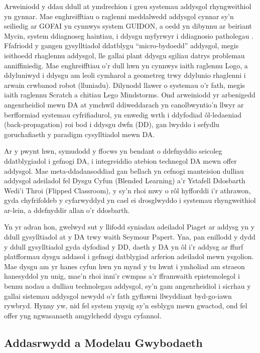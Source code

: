 Arweiniodd y ddau ddull at ymdrechion i greu systemau addysgol rhyngweithiol yn gynnar. Mae enghreifftiau o raglenni meddalwedd addysgol cynnar sy'n seiliedig ar GOFAI yn cynnwys system GUIDON, a oedd yn dibynnu ar beiriant Mycin, system ddiagnoseg haintiau, i ddysgu myfyrwyr i ddiagnosio patholegau \parencite{william_j_guidon_1983}. Ffafriodd y gangen gysylltiadol ddatblygu ``micro-bydoedd'' addysgol, megis ieithoedd rhaglennu addysgol, lle gallai plant ddysgu sgiliau datrys problemau anniffiniedig. Mae enghreifftiau o'r dull hwn yn cynnwys iaith raglennu Logo, a ddyluniwyd i ddysgu am leoli cymharol a geometreg trwy ddylunio rhaglenni i arwain crwbanod robot (lluniadu). Dilynodd llawer o systemau o'r fath, megis iaith raglennu Scratch a chitiau Lego Mindstorms. Ond arweiniodd yr arbenigedd angenrheidiol mewn DA at ymchwil ddiweddarach yn canolbwyntio'n llwyr ar berfformiad systemau cyfrifiadurol, yn enwedig wrth i ddyfodiad ôl-ledaeniad (back-propagation) roi bod i ddysgu dwfn (DD), gan lwyddo i sefydlu goruchafiaeth y paradigm cysylltiadol mewn DA\@.

Ar y pwynt hwn, symudodd y ffocws yn bendant o ddefnyddio seicoleg ddatblygiadol i gefnogi DA, i integreiddio atebion technegol DA mewn offer addysgol. Mae meta-ddadansoddiad gan \textcite{schmid_meta-analysis_2023} bellach yn cefnogi manteision dulliau addysgol adeiladol fel Dysgu Cyfun (Blended Learning) a'r Ystafell Ddosbarth Wedi'i Throi (Flipped Classroom), y sy'n rhoi mwy o rôl hyfforddi i'r athrawon, gyda chyfrifoldeb y cyfarwyddyd yn cael ei drosglwyddo i systemau rhyngweithiol ar-lein, a ddefnyddir allan o'r ddosbarth.

Yn yr adran hon, gwelwyd sut y llifodd syniadau adeiladol Piaget ar addysg yn y ddull gysylltiadol at y DA trwy waith Seymour Papert. Yna, pan enillodd y dydd y ddull gysylltiadol gyda dyfodiad y DD, daeth y DA yn ôl i'r addysg ar ffurf platfformau dysgu addasol i gefnogi datblygiad arferion adeiladol mewn ysgolion. Mae dysgu am yr hanes cyfun hwn yn mynd y tu hwnt i ymholiad am straeon hanesyddol yn unig, mae'n rhoi inni'r cwmpas a'r fframwaith epistemolegol i bennu nodau a dulliau technolegau addysgol, sy'n gam angenrheidiol i sicrhau y gallai sistemau addysgol newydd o'r fath gyflawni llwyddiant byd-go-iawn rywbryd. Hynny yw, nid fel system ynysig sy'n esblygu mewn gwactod, ond fel offer yng ngwasanaeth amgylchedd dysgu cyfannol.
    
    \subsection{Addasrwydd a Modelau Gwybodaeth}
